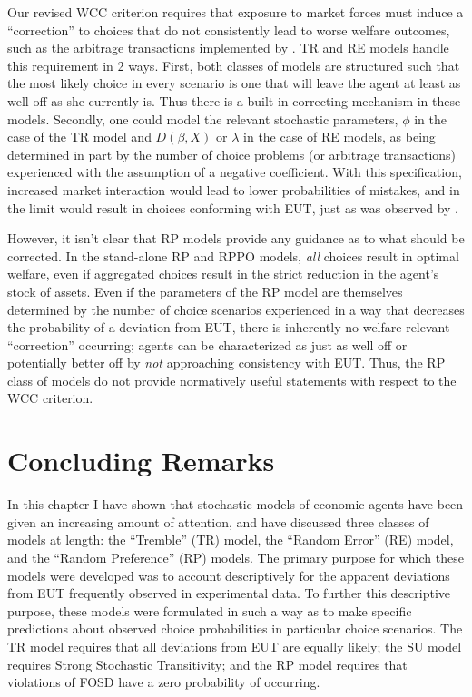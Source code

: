 \documentclass[../main.tex]{subfiles}
\begin{document}
Our revised WCC criterion requires that exposure to market forces must induce a \enquote{correction} to choices that do not consistently lead to worse welfare outcomes, such as the arbitrage transactions implemented by \textcite{Chu1990}.
TR and RE models handle this requirement in 2 ways.
First, both classes of models are structured such that the most likely choice in every scenario is one that will leave the agent at least as well off as she currently is.
Thus there is a built-in correcting mechanism in these models.
Secondly, one could model the relevant stochastic parameters, $\phi$ in the case of the TR model and $D(\beta,X)$ or $\lambda$ in the case of RE models, as being determined in part by the number of choice problems (or arbitrage transactions) experienced with the assumption of a negative coefficient.
With this specification, increased market interaction would lead to lower probabilities of mistakes, and in the limit would result in choices conforming with EUT, just as was observed by \textcite{Chu1990}.

However, it isn't clear that RP models provide any guidance as to what should be corrected.
In the stand-alone RP and RPPO models, \textit{all} choices result in optimal welfare, even if aggregated choices result in the strict reduction in the agent's stock of assets.
Even if the parameters of the RP model are themselves determined by the number of choice scenarios experienced in a way that decreases the probability of a deviation from EUT, there is inherently no welfare relevant \enquote{correction} occurring;
agents can be characterized as just as well off or potentially better off by \textit{not} approaching consistency with EUT.
Thus, the RP class of models do not provide normatively useful statements with respect to the WCC criterion.

\singlespacing
\section{Concluding Remarks}
\doublespacing

In this chapter I have shown that stochastic models of economic agents have been given an increasing amount of attention, and have discussed three classes of models at length: the \enquote{Tremble} (TR) model, the \enquote{Random Error} (RE) model, and the \enquote{Random Preference} (RP) models.
The primary purpose for which these models were developed was to account descriptively for the apparent deviations from EUT frequently observed in experimental data.
To further this descriptive purpose, these models were formulated in such a way as to make specific predictions about observed choice probabilities in particular choice scenarios.
The TR model requires that all deviations from EUT are equally likely;
the SU model requires Strong Stochastic Transitivity;
and the RP model requires that violations of FOSD have a zero probability of occurring.
\end{document}
